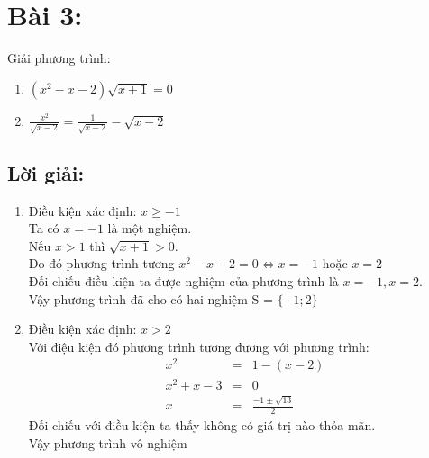 \section*{Bài 3:}
Giải phương trình:
\begin{enumerate}[label=(\alph*)]
\item $(x^2 - x - 2)\sqrt{x+1} = 0$
\item $\frac{x^2}{\sqrt{x-2}}=\frac{1}{\sqrt{x-2}} - \sqrt{x-2}$
\end{enumerate}

\subsection*{Lời giải:}
\begin{enumerate}[label=(\alph*)]
\item Điều kiện xác định: $x \geq -1$ \\
Ta có $x=-1$ là một nghiệm. \\
Nếu $x > 1$ thì $\sqrt{x+1} > 0$. \\
Do đó phương trình tương  $x^2 - x -2 = 0 \Leftrightarrow x=-1$ hoặc $x=2$ \\
Đối chiếu điều kiện ta được nghiệm của phương trình là $x = -1, x = 2$. \\
Vậy phương trình đã cho có hai nghiệm S = $\{-1; 2\}$
\item Điều kiện xác định: $x > 2$ \\
 Với điệu kiện đó phương trình tương đương với phương trình:
\begin{eqnarray*}
x^2 &=& 1 - (x-2) \\
x^2 + x -3 &=& 0 \\
x &=& \frac{-1 \pm \sqrt{13}}{2}
\end{eqnarray*}
Đối chiếu với điều kiện ta thấy không có giá trị nào thỏa mãn. \\
Vậy phương trình vô nghiệm
\end{enumerate}
